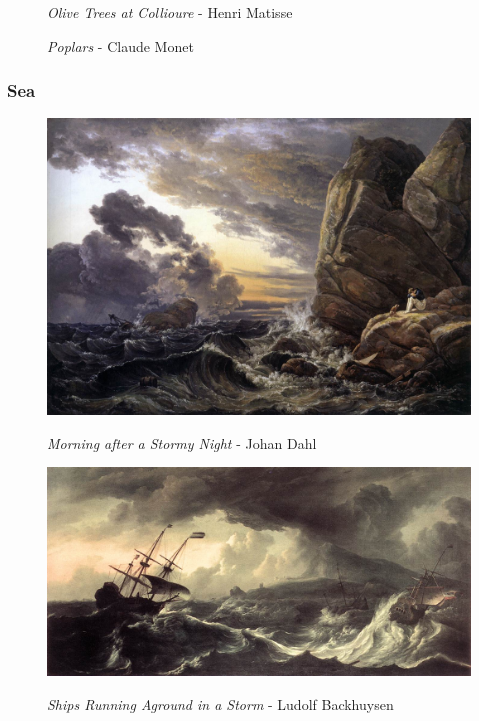 \documentclass[a4paper]{article}
\begin{document}
\begin {figure}[h!]
\begin{minipage}[b]{.49\textwidth}
\end{minipage}
\begin{minipage}[t]{.49\textwidth}
	\caption{\emph{Olive Trees at Collioure} - Henri Matisse}
\end{minipage}
\begin{minipage}[t]{.49\textwidth}
	\caption{\emph{Poplars} - Claude Monet}
\end{minipage}
\end{figure}


\newpage
\subsubsection{Sea}

\begin {figure}[h!]
\centering
\begin{minipage}[b]{.49\textwidth}
	\centering
	\includegraphics[width=\textwidth]{SeaPaintings/_Ext__dahlmorningafterastormynight.jpg}
    \caption{\emph{Morning after a Stormy Night} - Johan Dahl}
\end{minipage}
\hfill
\begin{minipage}[b]{.49\textwidth}
	\centering
	\includegraphics[width=\textwidth]{SeaPaintings/_Ext__backhuysenshipsrunningagroundinastorm.jpg}
    \caption{\emph{Ships Running Aground in a Storm} - Ludolf Backhuysen}
\end{minipage}
\end{figure}
\end{document}
